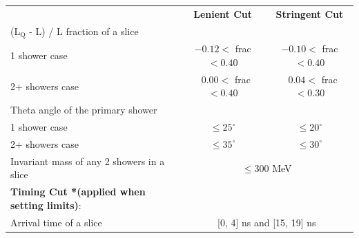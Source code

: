 \begin{table}[htbp!]
\begin{center}
\begin{tabular}{| p{7.75cm} | m{3.25cm} | m{3.25cm} |}
 & \multicolumn{1}{c|}{\textbf{Lenient Cut}}  & \multicolumn{1}{c|}{\textbf{Stringent Cut}} \\  
 \cline{2-3}
 (L$_\mathrm{Q}$ - L) / L fraction of a slice &  &  \\
  \hspace{0.5cm} 1 shower case & \multicolumn{1}{c|}{$-0.12 <$ frac $< 0.40$} & \multicolumn{1}{c|}{$-0.10 <$ frac $< 0.40$} \\
  \hspace{0.5cm} 2+ showers case & \multicolumn{1}{c|}{$\ \ \ 0.00 <$ frac $< 0.40$} & \multicolumn{1}{c|}{$\ \ \ 0.04 <$ frac $< 0.30$} \\ [1ex]
  Theta angle of the primary shower &  &  \\
  \hspace{0.5cm}1 shower case & \multicolumn{1}{c|}{$\leq 25^\circ$} & \multicolumn{1}{c|}{$\leq20^\circ$} \\
  \hspace{0.5cm}2+ showers case & \multicolumn{1}{c|}{$\leq 35^\circ$} & \multicolumn{1}{c|}{$\leq 30^\circ$} \\ [1ex]
  \cline{2-3} 
  Invariant mass of any 2 showers in a slice  & \multicolumn{2}{c|}{$\leq 300$ MeV} \\ [1ex]
 \hline
 \textbf{Timing Cut *(applied when setting limits)}: &  \multicolumn{2}{c|}{} \\ [1ex] 
 Arrival time of a slice & \multicolumn{2}{c|}{[0, 4] ns and [15, 19] ns} \\ [1ex]
 \hline
\end{tabular}
\end{center}
\end{table}

